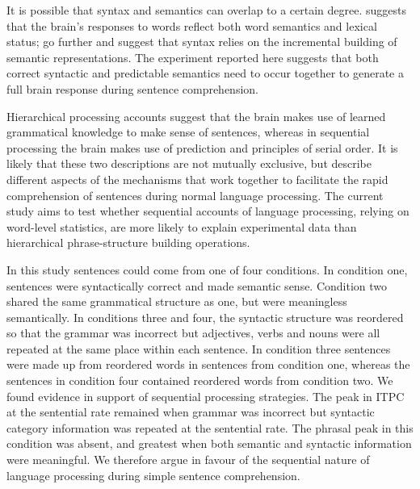 \documentclass[a4paper,10pt,twoside]{article}
\begin{document}
It is possible that syntax and semantics can overlap to a certain
degree. \cite{Pulvermuller2002} suggests that the brain's responses to
words reflect both word semantics and lexical status;
\cite{KempsonEtAl2016} go further and suggest that syntax relies on
the incremental building of semantic representations. The experiment
reported here suggests that both correct syntactic and predictable
semantics need to occur together to generate a full brain response
during sentence comprehension. 

Hierarchical processing accounts suggest that the brain makes use of
learned grammatical knowledge to make sense of sentences, whereas in
sequential processing the brain makes use of prediction and principles
of serial order. It is likely that these two descriptions are not
mutually exclusive, but describe different aspects of the mechanisms
that work together to facilitate the rapid comprehension of sentences
during normal language processing. The current study aims to test
whether sequential accounts of language processing, relying on
word-level statistics, are more likely to explain experimental data
than hierarchical phrase-structure building operations. 

In this study sentences could come from one of four conditions. In condition one, sentences
were syntactically correct and made semantic sense. Condition two
shared the same grammatical structure as one, but were meaningless
semantically. In conditions three and four, the syntactic structure
was reordered so that the grammar was incorrect but adjectives, verbs
and nouns were all repeated at the same place within each sentence. In
condition three sentences were made up from reordered words in
sentences from condition one, whereas the sentences in condition four
contained reordered words from condition two. We found evidence in
support of sequential processing strategies. The peak in ITPC at the
sentential rate remained when grammar was incorrect but syntactic
category information was repeated at the sentential rate. The phrasal
peak in this condition was absent, and greatest when both semantic and
syntactic information were meaningful. We therefore argue in favour of
the sequential nature of language processing during simple sentence
comprehension.


         

\end{document}
